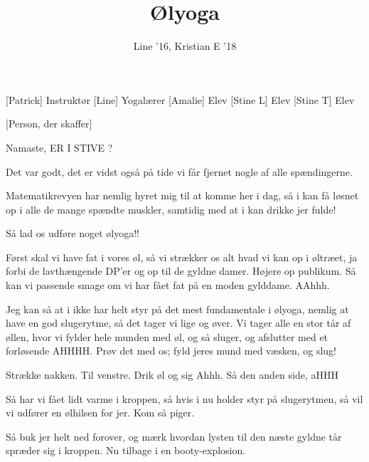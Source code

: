 \documentclass[a4paper,11pt]{article}
\title{Ølyoga}
\author{Line '16, Kristian E '18}
\begin{document}
\maketitle

\begin{roles}
[Patrick] Instruktør
[Line] Yogalærer
[Amalie] Elev
[Stine L] Elev
[Stine T] Elev
\end{roles}

\begin{props}
[Person, der skaffer]
\end{props}

\begin{sketch}

 Namaste, ER I STIVE ?

 Det var godt, det er vidst også på tide vi får fjernet nogle af alle spændingerne.

 Matematikrevyen har nemlig hyret mig til at komme her i dag, så i kan få løsnet op i alle de mange spændte muskler, samtidig med at i kan drikke jer fulde!

 Så lad os udføre noget ølyoga!!


 Først skal vi have fat i vores øl, så vi strækker os alt hvad vi kan op i øltræet, ja forbi de lavthængende DP'er og op til de gyldne damer. Højere op publikum. Så kan vi passende smage om vi har fået fat på en moden gylddame. AAhhh.

 Jeg kan så at i ikke har helt styr på det mest fundamentale i ølyoga, nemlig at have en god slugerytme, så det tager vi lige og øver. Vi tager alle en stor tår af øllen, hvor vi fylder hele munden med øl, og så sluger, og afslutter med et forløsende AHHHH. Prøv det med os; fyld jeres mund med væsken, og slug! 

 Strække nakken. Til venstre. Drik øl og sig Ahhh. Så den anden side, aHHH

 Så har vi fået lidt varme i kroppen, så hvis i nu holder styr på slugerytmen, så vil vi udfører en ølhilsen for jer. Kom så piger.


 Så buk jer helt ned forover, og mærk hvordan lysten til den næste gyldne tår spræder sig i kroppen. Nu tilbage i en booty-explosion.


\end{sketch}
\end{document}
